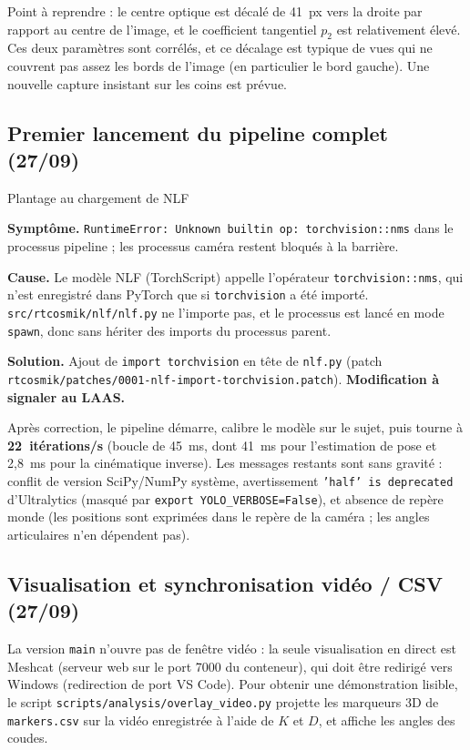 \documentclass[11pt,a4paper]{article}
\newcommand{\symptome}[1]{\par\noindent\textbf{Symptôme.} #1}
\newcommand{\cause}[1]{\par\smallskip\noindent\textbf{Cause.} #1}
\newcommand{\solution}[1]{\par\smallskip\noindent\textbf{Solution.} #1}
\newcommand{\code}[1]{\texttt{\small #1}}
\begin{document}
Point à reprendre : le centre optique est décalé de 41~px vers la droite par rapport au centre de l'image, et le coefficient tangentiel $p_2$ est relativement élevé. Ces deux paramètres sont corrélés, et ce décalage est typique de vues qui ne couvrent pas assez les bords de l'image (en particulier le bord gauche). Une nouvelle capture insistant sur les coins est prévue.

\subsection{Premier lancement du pipeline complet (27/09)}

\begin{probleme}{Plantage au chargement de NLF}
\symptome{\code{RuntimeError: Unknown builtin op: torchvision::nms} dans le processus pipeline ; les processus caméra restent bloqués à la barrière.}
\cause{Le modèle NLF (TorchScript) appelle l'opérateur \code{torchvision::nms}, qui n'est enregistré dans PyTorch que si \code{torchvision} a été importé. \code{src/rtcosmik/nlf/nlf.py} ne l'importe pas, et le processus est lancé en mode \code{spawn}, donc sans hériter des imports du processus parent.}
\solution{Ajout de \code{import torchvision} en tête de \code{nlf.py} (patch \code{rtcosmik/patches/0001-nlf-import-torchvision.patch}). \textbf{Modification à signaler au LAAS.}}
\end{probleme}

Après correction, le pipeline démarre, calibre le modèle sur le sujet, puis tourne à \textbf{22~itérations/s} (boucle de 45~ms, dont 41~ms pour l'estimation de pose et 2,8~ms pour la cinématique inverse). Les messages restants sont sans gravité : conflit de version SciPy/NumPy système, avertissement \code{'half' is deprecated} d'Ultralytics (masqué par \code{export YOLO\_VERBOSE=False}), et absence de repère monde (les positions sont exprimées dans le repère de la caméra ; les angles articulaires n'en dépendent pas).

\subsection{Visualisation et synchronisation vidéo / CSV (27/09)}

La version \code{main} n'ouvre pas de fenêtre vidéo : la seule visualisation en direct est Meshcat (serveur web sur le port 7000 du conteneur), qui doit être redirigé vers Windows (redirection de port VS Code). Pour obtenir une démonstration lisible, le script \code{scripts/analysis/overlay\_video.py} projette les marqueurs 3D de \code{markers.csv} sur la vidéo enregistrée à l'aide de $K$ et $D$, et affiche les angles des coudes.
\end{document}
